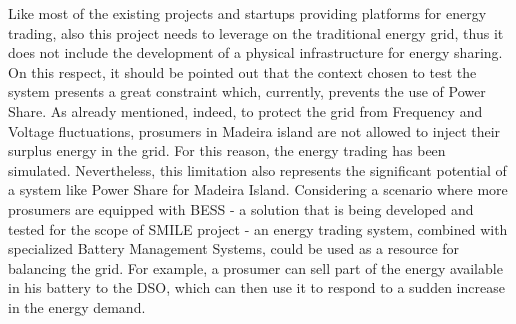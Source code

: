 Like most of the existing projects and startups providing platforms for energy trading, also this project needs to leverage on the traditional energy grid, thus it does not include the development of a physical infrastructure for energy sharing. On this respect, it should be pointed out that the context chosen to test the system presents a great constraint which, currently, prevents the use of Power Share. As already mentioned, indeed, to protect the grid from Frequency and Voltage fluctuations, prosumers in Madeira island are not allowed to inject their surplus energy in the grid. For this reason, the energy trading has been simulated. Nevertheless, this limitation also represents the significant potential of a system like Power Share for Madeira Island. Considering a scenario where more prosumers are equipped with \ac{BESS} - a solution that is being developed and tested for the scope of SMILE project - an energy trading system, combined with specialized Battery Management Systems, could be used as a resource for balancing the grid. For example, a prosumer can sell part of the energy available in his battery to the \ac{DSO}, which can then use it to respond to a sudden increase in the energy demand.


